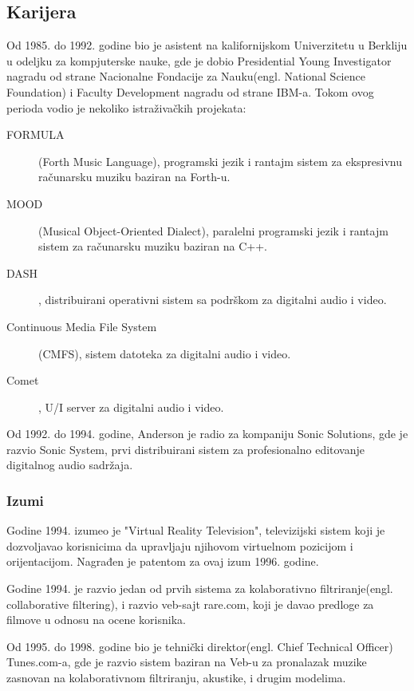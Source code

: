 \documentclass[titlepage, 12pt]{article}
\begin{document}
\subsection{Karijera}
Od 1985. do 1992. godine bio je asistent na kalifornijskom Univerzitetu u Berkliju u odeljku za kompjuterske nauke, gde je dobio Presidential Young Investigator nagradu od strane Nacionalne Fondacije za Nauku(engl. National Science Foundation) i Faculty Development nagradu od strane IBM-a. Tokom ovog perioda vodio je nekoliko istraživačkih projekata:
\begin{description}
	\item[FORMULA] (Forth Music Language), programski jezik i rantajm sistem za ekspresivnu računarsku muziku baziran na Forth-u.
	\item[MOOD] (Musical Object-Oriented Dialect), paralelni programski jezik i rantajm sistem za računarsku muziku baziran na C++.
	
	\item[DASH], distribuirani operativni sistem sa podrškom za digitalni audio i video.
	
	\item[Continuous Media File System] (CMFS), sistem datoteka za digitalni audio i video.
	
	\item[Comet], U/I server za digitalni audio i video.
	
\end{description}
Od 1992. do 1994. godine, Anderson je radio za kompaniju Sonic Solutions, gde je razvio Sonic System, prvi distribuirani sistem za profesionalno editovanje digitalnog audio sadržaja.

\subsubsection{Izumi}
Godine 1994. izumeo je "Virtual Reality Television", televizijski sistem koji je dozvoljavao korisnicima da upravljaju njihovom virtuelnom pozicijom i orijentacijom. Nagrađen je patentom za ovaj izum 1996. godine.

Godine 1994. je razvio jedan od prvih sistema za kolaborativno filtriranje(engl. collaborative filtering), i razvio veb-sajt rare.com, koji je davao predloge za filmove u odnosu na ocene korisnika.

Od 1995. do 1998. godine bio je tehnički direktor(engl. Chief Technical Officer) Tunes.com-a, gde je razvio sistem baziran na Veb-u za pronalazak muzike zasnovan na kolaborativnom filtriranju, akustike, i drugim modelima.
\end{document}
